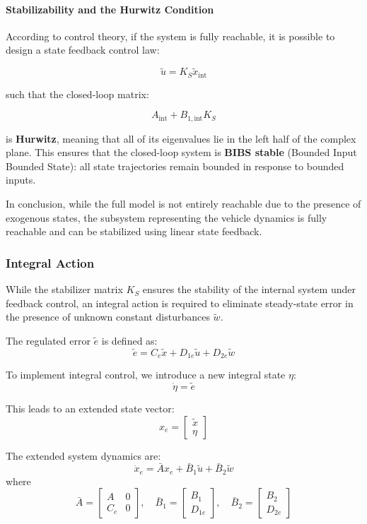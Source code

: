 \documentclass[]{report}
\begin{document}
	\paragraph{Stabilizability and the Hurwitz Condition}
	
	According to control theory, if the system is fully reachable, it is possible to design a state feedback control law:
	
	\[
	\tilde{u} = K_S \tilde{x}_{\text{int}}
	\]
	
	such that the closed-loop matrix:
	
	\[
	A_{\text{int}} + B_{1,\text{int}} K_S
	\]
	
	is \textbf{Hurwitz}, meaning that all of its eigenvalues lie in the left half of the complex plane. This ensures that the closed-loop system is \textbf{BIBS stable} (Bounded Input Bounded State): all state trajectories remain bounded in response to bounded inputs.
	
	In conclusion, while the full model is not entirely reachable due to the presence of exogenous states, the subsystem representing the vehicle dynamics is fully reachable and can be stabilized using linear state feedback.
	
	
	\subsubsection{Integral Action}
	
	While the stabilizer matrix $K_S$ ensures the stability of the internal system under feedback control, an integral action is required to eliminate steady-state error in the presence of unknown constant disturbances $\tilde{w}$.
	
	The regulated error $\tilde{e}$ is defined as:
	\[
	\tilde{e} = C_e \tilde{x} + D_{1e} \tilde{u} + D_{2e} \tilde{w}
	\]
	
	To implement integral control, we introduce a new integral state $\eta$:
	\[
	\dot{\eta} = \tilde{e}
	\]
	
	This leads to an extended state vector:
	\[
	x_e = \begin{bmatrix} \tilde{x} \\ \eta \end{bmatrix}
	\]
	
	The extended system dynamics are:
	\[
	\dot{x}_e = \bar{A} x_e + \bar{B}_1 \tilde{u} + \bar{B}_2 \tilde{w}
	\]
	where
	\[
	\bar{A} = \begin{bmatrix}
		A & 0 \\
		C_e & 0
	\end{bmatrix},
	\quad
	\bar{B}_1 = \begin{bmatrix}
		B_1 \\
		D_{1e}
	\end{bmatrix},
	\quad
	\bar{B}_2 = \begin{bmatrix}
		B_2 \\
		D_{2e}
	\end{bmatrix}
	\]
	
\end{document}
